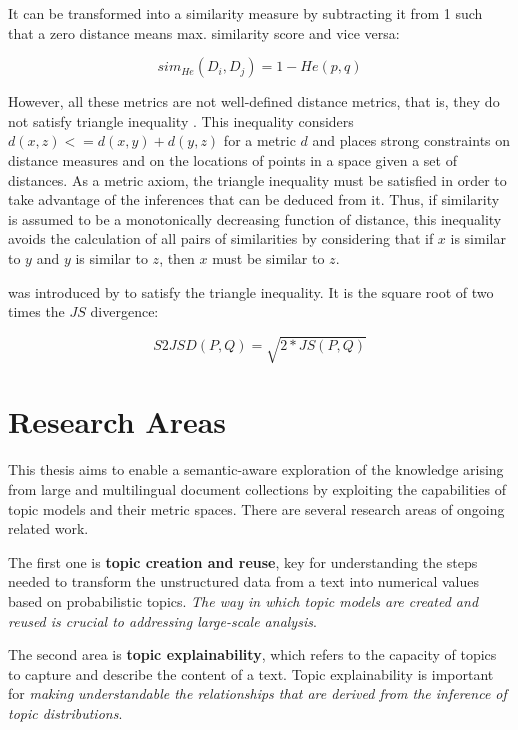 It can be transformed into a similarity measure by subtracting it from 1 \citep{Rus2013} such that a zero distance means max. similarity score and vice versa:

\begin{equation}
	sim_{He}(D_i, D_j) = 1 - He(p,q)
	\label{eq:simhe}
\end{equation}

However, all these metrics are not well-defined distance metrics, that is, they do not satisfy triangle inequality \citep{Charikar2002}. This inequality considers $d(x, z) <= d(x, y) + d(y, z)$ for a metric $d$ \citep{Griffiths2007} and places strong constraints on distance measures and on the locations of points in a space given a set of distances. As a metric axiom, the triangle inequality must be satisfied in order to take advantage of the inferences that can be deduced from it. Thus, if similarity is assumed to be a monotonically decreasing function of distance, this inequality avoids the calculation of all pairs of similarities by considering that if $x$ is similar to $y$ and $y$ is similar to $z$, then $x$ must be similar to $z$. 

 was introduced by \citep{Endres2003} to satisfy the triangle inequality. It is the square root of two times the $JS$ divergence:

\begin{equation}
    S2JSD(P,Q) = \sqrt{2*JS(P,Q)}
\label{eq:s2jsd}
\end{equation}

\section{Research Areas}
\label{sec:research-topic}

This thesis aims to enable a semantic-aware exploration of the knowledge arising from large and multilingual document collections by exploiting the capabilities of topic models and their metric spaces. There are several research areas of ongoing related work. 

The first one is \textbf{topic creation and reuse}, key for understanding the steps needed to transform the unstructured data from a text into numerical values based on probabilistic topics. \textit{The way in which topic models are created and reused is crucial to addressing large-scale analysis}. 

The second area is \textbf{topic explainability}, which refers to the capacity of topics to capture and describe the content of a text. Topic explainability is important for \textit{making understandable the relationships that are derived from the inference of topic distributions}. 

